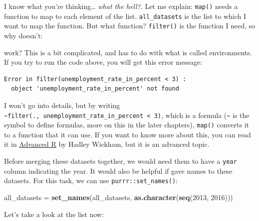 \documentclass[]{gitbook}
\newenvironment{Shaded}{\begin{snugshade}}{\end{snugshade}}
\newcommand{\DecValTok}[1]{\textcolor[rgb]{0.00,0.00,0.81}{#1}}
\newcommand{\KeywordTok}[1]{\textcolor[rgb]{0.13,0.29,0.53}{\textbf{#1}}}
\newcommand{\NormalTok}[1]{#1}
\newcommand{\OperatorTok}[1]{\textcolor[rgb]{0.81,0.36,0.00}{\textbf{#1}}}
\newcommand{\StringTok}[1]{\textcolor[rgb]{0.31,0.60,0.02}{#1}}
\begin{document}
I know what you're thinking\ldots{} \emph{what the hell?}. Let me explain: \texttt{map()} needs a function to map to
each element of the list. \texttt{all\_datasets} is the list to which I want to map the function. But what
function? \texttt{filter()} is the function I need, so why doesn't:

\begin{Shaded}
\end{Shaded}

work? This is a bit complicated, and has to do with what is called environments. If you try to run
the code above, you will get this error message:

\begin{verbatim}
Error in filter(unemployment_rate_in_percent < 3) :
  object 'unemployment_rate_in_percent' not found
\end{verbatim}

I won't go into details, but by writing \texttt{\textasciitilde{}filter(.,\ unemployment\_rate\_in\_percent\ \textless{}\ 3)}, which is a
formula (\texttt{\textasciitilde{}} is the symbol to define formulas, more on this in the later chapters), \texttt{map()}
converts it to a function that it can use. If you want to know more about this, you can read it in
\href{http://adv-r.had.co.nz/Functional-programming.html\#closures}{Advanced R} by Hadley Wickham, but it
is an advanced topic.

Before merging these datasets together, we would need them to have a \texttt{year} column indicating the
year. It would also be helpful if gave names to these datasets. For this task, we can use
\texttt{purrr::set\_names()}:

\begin{Shaded}
\begin{Highlighting}[]
\NormalTok{all_datasets =}\StringTok{ }\KeywordTok{set_names}\NormalTok{(all_datasets, }\KeywordTok{as.character}\NormalTok{(}\KeywordTok{seq}\NormalTok{(}\DecValTok{2013}\NormalTok{, }\DecValTok{2016}\NormalTok{)))}
\end{Highlighting}
\end{Shaded}

Let's take a look at the list now:
\end{document}
